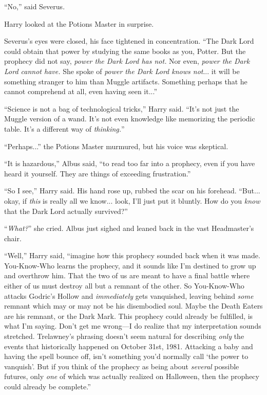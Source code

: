 “No,” said Severus.

Harry looked at the Potions Master in surprise.

Severus’s eyes were closed, his face tightened in concentration. “The Dark Lord could obtain that power by studying the same books as you, Potter. But the prophecy did not say, \emph{power the Dark Lord has not.} Nor even, \emph{power the Dark Lord cannot have.} She spoke of \emph{power the Dark Lord knows not}... it will be something stranger to him than Muggle artifacts. Something perhaps that he cannot comprehend at all, even having seen it...”

“Science is not a bag of technological tricks,” Harry said. “It’s not just the Muggle version of a wand. It’s not even knowledge like memorizing the periodic table. It’s a different way of \emph{thinking.}”

“Perhaps...” the Potions Master murmured, but his voice was skeptical.

“It is hazardous,” Albus said, “to read too far into a prophecy, even if you have heard it yourself. They are things of exceeding frustration.”

“So I see,” Harry said. His hand rose up, rubbed the scar on his forehead. “But... okay, if \emph{this} is really all we know... look, I’ll just put it bluntly. How do you \emph{know} that the Dark Lord actually survived?”

“\emph{What?}” she cried. Albus just sighed and leaned back in the vast Headmaster’s chair.

“Well,” Harry said, “imagine how this prophecy sounded back when it was made. You-Know-Who learns the prophecy, and it sounds like I’m destined to grow up and overthrow him. That the two of us are meant to have a final battle where either of us must destroy all but a remnant of the other. So You-Know-Who attacks Godric’s Hollow and \emph{immediately} gets vanquished, leaving behind \emph{some} remnant which may or may not be his disembodied soul. Maybe the Death Eaters are his remnant, or the Dark Mark. This prophecy could already be fulfilled, is what I’m saying. Don’t get me wrong—I do realize that my interpretation sounds stretched. Trelawney’s phrasing doesn’t seem natural for describing \emph{only} the events that historically happened on October 31st, 1981. Attacking a baby and having the spell bounce off, isn’t something you’d normally call ‘the power to vanquish’. But if you think of the prophecy as being about \emph{several} possible futures, only \emph{one} of which was actually realized on Halloween, then the prophecy could already be complete.”

